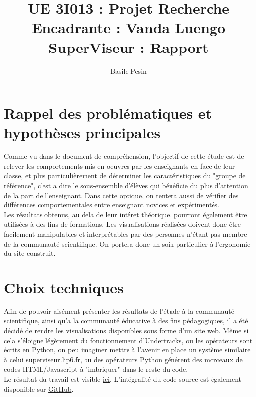 \documentclass{article}
\title{UE 3I013 : Projet Recherche\\
    Encadrante : Vanda Luengo\\
    SuperViseur : Rapport}
\author{Basile Pesin}
\begin{document}
\maketitle
\newpage

\section{Rappel des problématiques et hypothèses principales}
Comme vu dans le document de compréhension, l'objectif de cette étude est de relever les comportements mis en oeuvres par les enseignants en face de leur classe, et plus particulièrement de déterminer les caractéristiques du "groupe de référence", c'est a dire le sous-ensemble d'élèves qui bénéficie du plus d'attention de la part de l'enseignant. Dans cette optique, on tentera aussi de vérifier des différences comportementales entre enseignant novices et expérimentés.\\
Les résultats obtenus, au dela de leur intéret théorique, pourront également être utilisées à des fins de formations. Les visualisations réalisées doivent donc être facilement manipulables et interprétables par des personnes n'étant pas membre de la communauté scientifique. On portera donc un soin particulier à l'ergonomie du site construit.

\section{Choix techniques}
Afin de pouvoir aisément présenter les résultats de l'étude à la communauté scientifique, ainsi qu'a la communauté éducative à des fins pédagogiques, il a été décidé de rendre les visualisations disponibles sous forme d'un site web. Même si cela s'éloigne légèrement du fonctionnement d'\href{https://undertracks.imag.fr}{Undertracks}, ou les opérateurs sont écrits en Python, on peu imaginer mettre à l'avenir en place un système similaire à celui \href{http://superviseur.lip6.fr}{superviseur.lip6.fr}, ou des opérateurs Python générent des morceaux de codes HTML/Javascript à "imbriquer" dans le reste du code.\\
Le résultat du travail est visible \href{https://vertmo.github.io/SuperViseur/}{ici}. L'intégralité du code source est également disponible sur \href{https://github.com/Vertmo/SuperViseur}{GitHub}.
\end{document}
